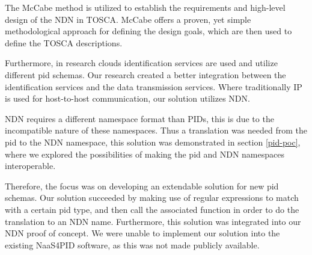 The McCabe method \cite{mccabe2010network} is utilized to establish the requirements and high-level design of the NDN in TOSCA. McCabe offers a proven, yet simple methodological approach for defining the design goals, which are then used to define the TOSCA descriptions.

Furthermore, in research clouds identification services are used and utilize different \gls{pid} schemas. Our research created a better integration between the identification services and the data transmission services. Where traditionally IP is used for host-to-host communication, our solution utilizes NDN.







NDN requires a different namespace format than PIDs, this is due to the incompatible nature of these namespaces. Thus a translation was needed from the \gls{pid} to the NDN namespace, this solution was demonstrated in section \ref{pid-poc}, where we explored the possibilities of making the \gls{pid} and NDN namespaces interoperable.

Therefore, the focus was on developing an extendable solution for new \gls{pid} schemas. Our solution succeeded by making use of regular expressions to match with a certain \gls{pid} type, and then call the associated function in order to do the translation to an NDN name. Furthermore, this solution was integrated into our NDN proof of concept. We were unable to implement our solution into the existing NaaS4PID software, as this was not made publicly available.

